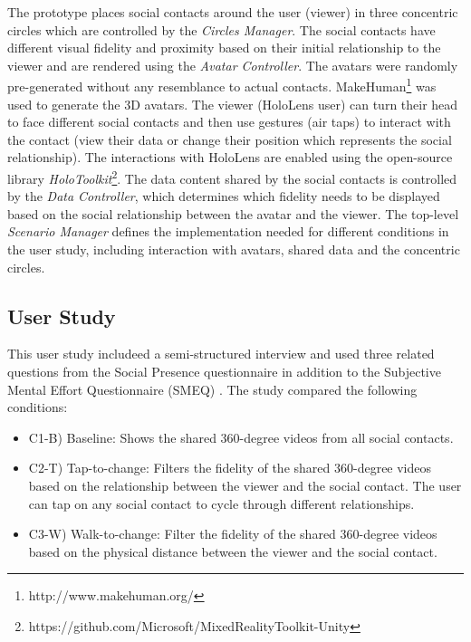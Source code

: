 The prototype places social contacts around the user (viewer) in three concentric circles which are controlled by the \textit{Circles Manager}. The social contacts have different visual fidelity and proximity based on their initial relationship to the viewer and are rendered using the \textit{Avatar Controller}. The avatars were randomly pre-generated without any resemblance to actual contacts. MakeHuman\footnote{http://www.makehuman.org/} was used to generate the 3D avatars. The viewer (HoloLens user) can turn their head to face different social contacts and then use gestures (air taps) to interact with the contact (view their data or change their position which represents the social relationship). The interactions with HoloLens are enabled using the open-source library \textit{HoloToolkit}\footnote{https://github.com/Microsoft/MixedRealityToolkit-Unity}. The data content shared by the social contacts is controlled by the \textit{Data Controller}, which determines which fidelity needs to be displayed based on the social relationship between the avatar and the viewer. The top-level \textit{Scenario Manager} defines the implementation needed for different conditions in the user study, including interaction with avatars, shared data and the concentric circles. 

\subsection{User Study}
This user study includeed a semi-structured interview and used three related questions from the Social Presence questionnaire in addition to the Subjective Mental Effort Questionnaire (SMEQ) \cite{Sauro2009}. The study compared the following conditions: 

\begin{itemize}
    \item C1-B) Baseline: Shows the shared 360-degree videos from all social contacts.
    \item C2-T) Tap-to-change: Filters the fidelity of the shared 360-degree videos based on the relationship between the viewer and the social contact. The user can tap on any social contact to cycle through different relationships.
    \item C3-W) Walk-to-change: Filter the fidelity of the shared 360-degree videos based on the physical distance between the viewer and the social contact.
\end{itemize}

